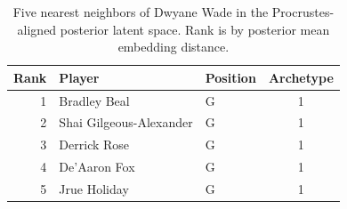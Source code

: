 \begin{table}[htbp]
  \centering\small
  \begin{tabular}{rllc}
    \toprule
    Rank & Player & Position & Archetype \\
    \midrule
    1 & Bradley Beal & G & 1 \\
    2 & Shai Gilgeous-Alexander & G & 1 \\
    3 & Derrick Rose & G & 1 \\
    4 & De'Aaron Fox & G & 1 \\
    5 & Jrue Holiday & G & 1 \\
    \bottomrule
  \end{tabular}
  \caption{Five nearest neighbors of Dwyane Wade in the Procrustes-aligned posterior latent space. Rank is by posterior mean embedding distance.}
  \label{tab:Dwyane_Wade_neighbors}
\end{table}


